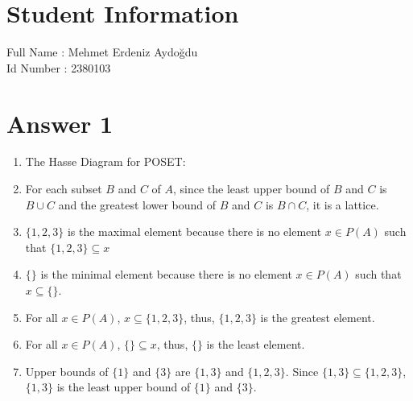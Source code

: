 \documentclass[12pt]{article}
\begin{document}
\section*{Student Information } 
Full Name :  Mehmet Erdeniz Aydoğdu \\
Id Number :  2380103 \\

\section*{Answer 1}
\renewcommand{\labelenumi}{\textbf{\alph{enumi}.}}
\begin{enumerate}
    \item The Hasse Diagram for POSET: \newline
    \begin{center}
\end{center}
    \item For each subset $B$ and $C$ of $A$, since the least upper bound of $B$ and $C$ is $B \cup C$ and the greatest lower bound of $B$ and $C$ is $B \cap C$, it is a lattice.
    \item $\{1,2,3\}$ is the maximal element because there is no element $x \in P(A)$ such that $\{1,2,3\} \subseteq x$
    \item $\{\}$ is the minimal element because there is no element $x \in P(A)$ such that $x \subseteq \{\}$.
    \item For all $x \in P(A)$, $x \subseteq \{1,2,3\}$, thus, $\{1,2,3\}$ is the greatest element.
    \item For all $x \in P(A)$, $\{\} \subseteq x$, thus, $\{\}$ is the least element.
    \item Upper bounds of $\{1\}$ and $\{3\}$ are $\{1,3\}$ and $\{1,2,3\}$. Since $\{1,3\} \subseteq \{1,2,3\}$, $\{1,3\}$ is the least upper bound of $\{1\}$ and $\{3\}$.
\end{enumerate}
\newpage
\end{document}
